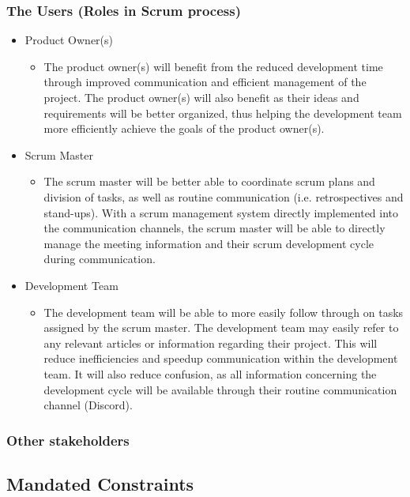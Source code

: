 \documentclass[12pt, titlepage]{article}
\begin{document}
\subsubsection{The Users (Roles in Scrum process)}
\begin{itemize}
    \item Product Owner(s)
    \begin{itemize}
      \item[] The product owner(s) will benefit from the reduced development time through improved communication and efficient management of the project. The product owner(s) will also benefit as their ideas and requirements will be better organized, thus helping the development team more efficiently achieve the goals of the product owner(s).
    \end{itemize}
    \item Scrum Master
    \begin{itemize}
      \item[] The scrum master will be better able to coordinate scrum plans and division of tasks, as well as routine communication (i.e. retrospectives and stand-ups). With a scrum management system directly implemented into the communication channels, the scrum master will be able to directly manage the meeting information and their scrum development cycle during communication.
    \end{itemize}
    \item Development Team
    \begin{itemize}
      \item[] The development team will be able to more easily follow through on tasks assigned by the scrum master. The development team may easily refer to any relevant articles or information regarding their project. This will reduce inefficiencies and speedup communication within the development team. It will also reduce confusion, as all information concerning the development cycle will be available through their routine communication channel (Discord).
    \end{itemize}
\end{itemize}
\subsubsection{Other stakeholders}


\subsection{Mandated Constraints}
\end{document}
